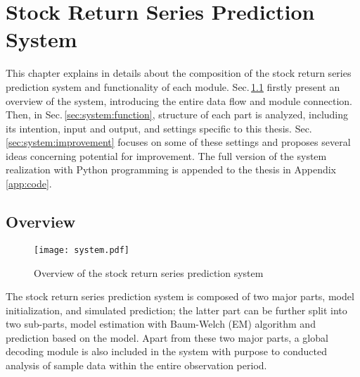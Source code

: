 
\chapter{Stock Return Series Prediction System}
\label{chap:system}

This chapter explains in details about the composition of 
the stock return series prediction system and functionality of each module.
Sec.\,\ref{sec:system:overview} firstly present an overview of the system,
introducing the entire data flow and module connection.
Then, in Sec.\,\ref{sec:system:function}, structure of each part is analyzed,
including its intention, input and output, and settings specific to this thesis.
Sec.\,\ref{sec:system:improvement} focuses on some of these settings 
and proposes several ideas concerning potential for improvement.
The full version of the system realization with Python programming is appended to the thesis 
in Appendix \ref{app:code}.


\section{Overview}
\label{sec:system:overview}

		\begin{figure}[!hbt]
        \center
        \texttt{[image: system.pdf]}
        \caption{Overview of the stock return series prediction system}
        \label{fig:system:overview}
        \end{figure}
The stock return series prediction system is composed of two major parts,
model initialization, and simulated prediction; 
the latter part can be further split into two sub-parts, 
model estimation with Baum-Welch (EM) algorithm and prediction based on the model.
Apart from these two major parts, 
a global decoding module is also included in the system 
with purpose to conducted analysis of sample data within the entire observation period.

